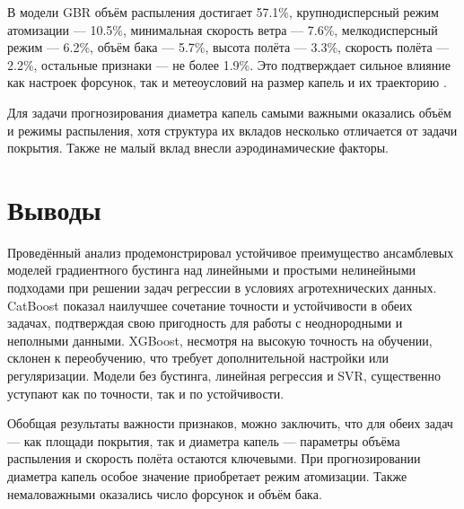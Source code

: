 В модели GBR объём распыления достигает 57.1\%, крупнодисперсный режим атомизации --- 10.5\%, минимальная скорость ветра --- 7.6\%, мелкодисперсный режим --- 6.2\%, объём бака --- 5.7\%, высота полёта --- 3.3\%, скорость полёта --- 2.2\%, остальные признаки --- не более 1.9\%. Это подтверждает сильное влияние как настроек форсунок, так и метеоусловий на размер капель и их траекторию \cite{Liu2025}.

Для задачи прогнозирования диаметра капель самыми важными оказались объём и режимы распыления, хотя структура их вкладов несколько отличается от задачи покрытия. Также не малый вклад внесли аэродинамические факторы.


\section{Выводы}

Проведённый анализ продемонстрировал устойчивое преимущество ансамблевых моделей градиентного бустинга над линейными и простыми нелинейными подходами при решении задач регрессии в условиях агротехнических данных. CatBoost показал наилучшее сочетание точности и устойчивости в обеих задачах, подтверждая свою пригодность для работы с неоднородными и неполными данными. XGBoost, несмотря на высокую точность на обучении, склонен к переобучению, что требует дополнительной настройки или регуляризации. Модели без бустинга, линейная регрессия и SVR, существенно уступают как по точности, так и по устойчивости.

Обобщая результаты важности признаков, можно заключить, что для обеих задач --- как площади покрытия, так и диаметра капель --- параметры объёма распыления и скорость полёта остаются ключевыми. При прогнозировании диаметра капель особое значение приобретает режим атомизации. Также немаловажными оказались число форсунок и объём бака.
